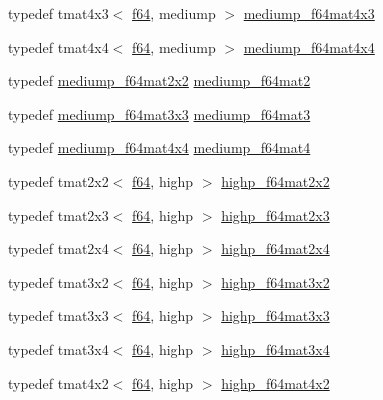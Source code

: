 \begin{DoxyCompactItemize}
typedef tmat4x3$<$ \hyperlink{group__gtc__type__precision_ga2bba392e555124b36cde6abba349bab3}{f64}, mediump $>$ \hyperlink{namespaceglm_ae6d05f1ef3c0af1285a298ed1a57cec3}{mediump\+\_\+f64mat4x3}
\item 
typedef tmat4x4$<$ \hyperlink{group__gtc__type__precision_ga2bba392e555124b36cde6abba349bab3}{f64}, mediump $>$ \hyperlink{namespaceglm_a16db659f891a49e36f057fa38e1b7524}{mediump\+\_\+f64mat4x4}
\item 
typedef \hyperlink{namespaceglm_adc818b8045259f2f2e33e735a9737dae}{mediump\+\_\+f64mat2x2} \hyperlink{namespaceglm_aa7eac0340d2aaf670ec4dfbd1826fd35}{mediump\+\_\+f64mat2}
\item 
typedef \hyperlink{namespaceglm_a22041536da675c1b971deb0d6ca0bba9}{mediump\+\_\+f64mat3x3} \hyperlink{namespaceglm_ae38a4a0b57e25d9cbb153dcaab9432ec}{mediump\+\_\+f64mat3}
\item 
typedef \hyperlink{namespaceglm_a16db659f891a49e36f057fa38e1b7524}{mediump\+\_\+f64mat4x4} \hyperlink{namespaceglm_a2763f655bfe2141a014e66d26a9d2f18}{mediump\+\_\+f64mat4}
\item 
typedef tmat2x2$<$ \hyperlink{group__gtc__type__precision_ga2bba392e555124b36cde6abba349bab3}{f64}, highp $>$ \hyperlink{namespaceglm_ab1d0281d417a194926995187e2d72f94}{highp\+\_\+f64mat2x2}
\item 
typedef tmat2x3$<$ \hyperlink{group__gtc__type__precision_ga2bba392e555124b36cde6abba349bab3}{f64}, highp $>$ \hyperlink{namespaceglm_a129f841fdcfda7a4e8d69e8b62989320}{highp\+\_\+f64mat2x3}
\item 
typedef tmat2x4$<$ \hyperlink{group__gtc__type__precision_ga2bba392e555124b36cde6abba349bab3}{f64}, highp $>$ \hyperlink{namespaceglm_aa92098382f2b39d4cd111868459e0a5a}{highp\+\_\+f64mat2x4}
\item 
typedef tmat3x2$<$ \hyperlink{group__gtc__type__precision_ga2bba392e555124b36cde6abba349bab3}{f64}, highp $>$ \hyperlink{namespaceglm_a7593188af43cdd18e62f77b02d060b18}{highp\+\_\+f64mat3x2}
\item 
typedef tmat3x3$<$ \hyperlink{group__gtc__type__precision_ga2bba392e555124b36cde6abba349bab3}{f64}, highp $>$ \hyperlink{namespaceglm_a6fec5193d73c03188d068d07801feef6}{highp\+\_\+f64mat3x3}
\item 
typedef tmat3x4$<$ \hyperlink{group__gtc__type__precision_ga2bba392e555124b36cde6abba349bab3}{f64}, highp $>$ \hyperlink{namespaceglm_ad2c12ef873498ae6631f18bf2a33f8eb}{highp\+\_\+f64mat3x4}
\item 
typedef tmat4x2$<$ \hyperlink{group__gtc__type__precision_ga2bba392e555124b36cde6abba349bab3}{f64}, highp $>$ \hyperlink{namespaceglm_a44d43f20896a22ab1ce1b4e57328d361}{highp\+\_\+f64mat4x2}

\end{DoxyCompactItemize}
